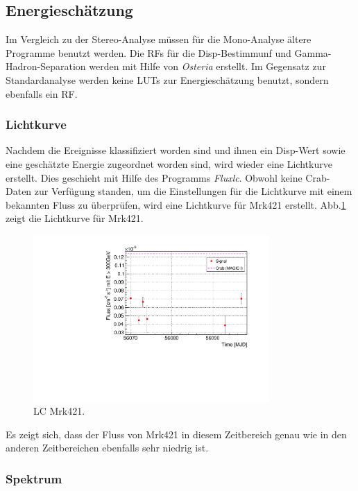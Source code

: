 \subsection{Energieschätzung}
Im Vergleich zu der Stereo-Analyse müssen für die Mono-Analyse ältere Programme benutzt werden.
Die RFs für die Disp-Bestimmunf und Gamma-Hadron-Separation werden mit Hilfe von \textit{Osteria} erstellt.
Im Gegensatz zur Standardanalyse werden keine LUTs zur Energieschätzung benutzt, sondern ebenfalls ein RF.

\subsubsection{Lichtkurve}
Nachdem die Ereignisse klassifiziert worden sind und ihnen ein Disp-Wert sowie eine geschätzte Energie zugeordnet worden sind, wird wieder eine Lichtkurve erstellt.
Dies geschieht mit Hilfe des Programms \textit{Fluxlc}.
Obwohl keine Crab-Daten zur Verfügung standen, um die Einstellungen für die Lichtkurve mit einem bekannten Fluss zu überprüfen, wird eine Lichtkurve für Mrk421 erstellt.
Abb.\ref{Datenset3_LC_Mrk421} zeigt die Lichtkurve für Mrk421.

\begin{figure}
    \centering
    \includegraphics[width=0.8\textwidth]{./Plots/04_MrkAnalyse/Datenset3/Datenset3_Mrk421_LC.pdf}
    \caption{LC Mrk421.}
    \label{Datenset3_LC_Mrk421}
\end{figure}

Es zeigt sich, dass der Fluss von Mrk421 in diesem Zeitbereich genau wie in den anderen Zeitbereichen ebenfalls sehr niedrig ist.


\subsubsection{Spektrum}

